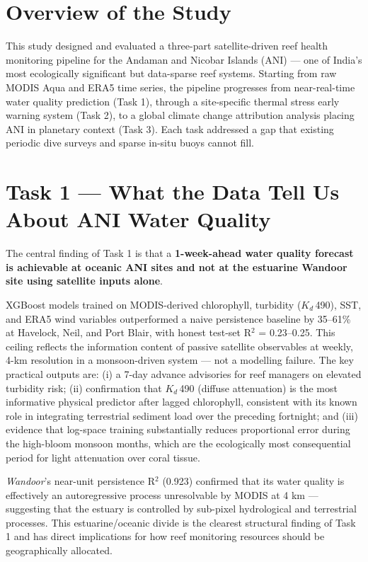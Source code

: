 \documentclass[12pt,a4paper]{report}
\begin{document}
\section{Overview of the Study}

This study designed and evaluated a three-part satellite-driven reef health monitoring
pipeline for the Andaman and Nicobar Islands (ANI) — one of India's most ecologically
significant but data-sparse reef systems. Starting from raw MODIS Aqua and ERA5
time series, the pipeline progresses from near-real-time water quality prediction
(Task 1), through a site-specific thermal stress early warning system (Task 2),
to a global climate change attribution analysis placing ANI in planetary context
(Task 3). Each task addressed a gap that existing periodic dive surveys and sparse
in-situ buoys cannot fill.

\section{Task 1 — What the Data Tell Us About ANI Water Quality}

The central finding of Task 1 is that a \textbf{1-week-ahead water quality forecast is
achievable at oceanic ANI sites and not at the estuarine Wandoor site using satellite
inputs alone}.

XGBoost models trained on MODIS-derived chlorophyll, turbidity ($K_d$\,490), SST,
and ERA5 wind variables outperformed a naive persistence baseline by 35--61\% at
Havelock, Neil, and Port Blair, with honest test-set R$^2$ = 0.23--0.25.
This ceiling reflects the information content of passive satellite observables at
weekly, 4-km resolution in a monsoon-driven system — not a modelling failure.
The key practical outputs are: (i) a 7-day advance advisories for reef managers on
elevated turbidity risk; (ii) confirmation that $K_d$\,490 (diffuse attenuation)
is the most informative physical predictor after lagged chlorophyll, consistent with
its known role in integrating terrestrial sediment load over the preceding fortnight;
and (iii) evidence that log-space training substantially reduces proportional error
during the high-bloom monsoon months, which are the ecologically most consequential
period for light attenuation over coral tissue.

\textit{Wandoor}'s near-unit persistence R$^2$ (0.923) confirmed that its water quality is
effectively an autoregressive process unresolvable by MODIS at 4 km — suggesting that
the estuary is controlled by sub-pixel hydrological and terrestrial processes.
This estuarine/oceanic divide is the clearest structural finding of Task 1 and has
direct implications for how reef monitoring resources should be geographically allocated.
\end{document}
